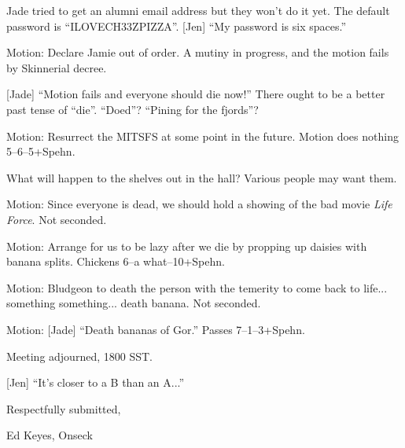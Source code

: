 \documentclass[12pt]{article}
\begin{document}
Jade tried to get an alumni email address but they won't do it yet.
The default password is ``ILOVECH33ZPIZZA''.  [Jen] ``My password
is six spaces.''

Motion: Declare Jamie out of order.  A mutiny in progress, and the
motion fails by Skinnerial decree.

[Jade] ``Motion fails and everyone should die now!''  There ought to
be a better past tense of ``die''.  ``Doed''?  ``Pining for the
fjords''?

Motion: Resurrect the MITSFS at some point in the future.  Motion
does nothing 5--6--5+Spehn.

What will happen to the shelves out in the hall?  Various people
may want them.

Motion: Since everyone is dead, we should hold a showing of the
bad movie {\em Life Force}.  Not seconded.

Motion: Arrange for us to be lazy after we die by propping up daisies
with banana splits.  Chickens 6--a what--10+Spehn.

Motion: Bludgeon to death the person with the temerity to come back
to life... something something... death banana.  Not seconded.

Motion: [Jade] ``Death bananas of Gor.''  Passes 7--1--3+Spehn.

\vspace{12pt}

\noindent
Meeting adjourned, 1800 SST.

[Jen] ``It's closer to a B than an A...''

\vspace{18pt}

\centerline{Respectfully submitted,}
\centerline{Ed Keyes, Onseck}
\end{document}

